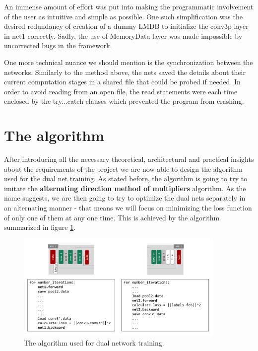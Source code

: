 \documentclass[a4paper, 12pt]{article}
\numberwithin{equation}{section}
\begin{document}
	An immense amount of effort was put into making the programmatic involvement of the user as intuitive and simple as possible. One such simplification was the desired redundancy of creation of a dummy LMDB to initialize the conv3p layer in net1 correctly. Sadly, the use of MemoryData layer was made impossible by uncorrected bugs in the framework.

	One more technical nuance we should mention is the synchronization between the networks. Similarly to the method above, the nets saved the details about their current computation stages in a shared file that could be probed if needed. In order to avoid reading from an open file, the read statements were each time enclosed by the try...catch clauses which prevented the program from crashing.

	\section{The algorithm} \label{sec:algorithm}

	After introducing all the necessary theoretical, architectural and practical insights about the requirements of the project we are now able to design the algorithm used for the dual net training. As stated before, the algorithm is going to try to imitate the \textbf{alternating direction method of multipliers} algorithm. As the name suggests, we are then going to try to optimize the dual nets separately in an alternating manner - that means we will focus on minimizing the loss function of only one of them at any one time. This is achieved by the algorithm summarized in figure \ref{fig:algorithm}.

	\begin{figure}[!h]
		\centering
		\includegraphics[page=1,width=0.9\textwidth]{algocode.pdf}
		\caption{\label{fig:algorithm}{The algorithm used for dual network training.}}
	\end{figure}
\end{document}
